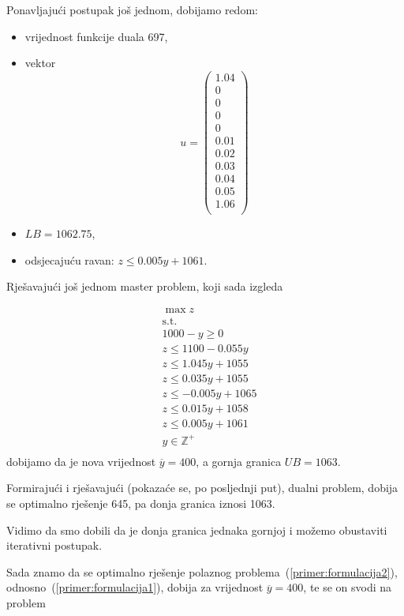 \documentclass[b5paper, utf8, 11pt, colorlinks]{book}
\theoremstyle{definition}
\begin{document}
 Ponavljajući postupak još jednom, dobijamo redom: 
 \begin{itemize}
 	\item 
 vrijednost funkcije duala 697,
 \item vektor 
  $$u=\left(\begin{array}{c}
 	1.04\\
 	0\\
 	0\\
 	0\\
 	0\\
 	0.01\\
 	0.02\\
 	0.03\\
 	0.04\\
 	0.05\\
 	1.06\\
 \end{array}\right)$$
\item $LB = 1062.75$,
\item odsjecajuću ravan:  $z\leqslant 0.005y+1061$.
\end{itemize}


Rješavajući još jednom master problem, koji sada izgleda

  $$
\begin{aligned}
	&\max z\\
	&\mbox{s.t.}\\
	&1000-y\geqslant 0\\
	&z\leqslant 1100-0.055y\\ 
	&z\leqslant 1.045y+1055\\
	&z\leqslant 0.035y+1055\\
	&z\leqslant -0.005y+1065\\
	&z\leqslant 0.015y+1058\\
	&z\leqslant 0.005y+1061\\
	&y\in\mathbb{Z}^+\\	
\end{aligned}
$$
dobijamo da je nova vrijednost $\overline{y}=400$, a gornja granica $UB = 1063$.

Formirajući i rješavajući (pokazaće se, po posljednji put), dualni problem, dobija se optimalno rješenje 645, pa donja granica iznosi 1063.

Vidimo da smo dobili da je donja granica jednaka gornjoj i možemo obustaviti iterativni postupak.

Sada znamo da se optimalno rješenje polaznog problema~(\ref{primer:formulacija2}), odnosno~(\ref{primer:formulacija1}), dobija za vrijednost $\overline{y}=400$, te se on svodi na problem
\end{document}
